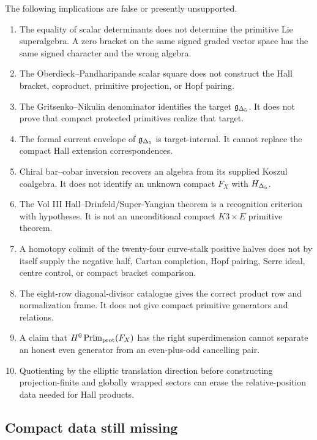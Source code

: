 The following implications are false or presently unsupported.
\begin{enumerate}
\item The equality of scalar determinants does not determine the primitive
Lie superalgebra.  A zero bracket on the same signed graded vector space has
the same signed character and the wrong algebra.
\item The Oberdieck--Pandharipande scalar square does not construct the Hall
bracket, coproduct, primitive projection, or Hopf pairing.
\item The Gritsenko--Nikulin denominator identifies the target
\(\mathfrak g_{\Delta_{5}}\).  It does not prove that compact protected primitives realize
that target.
\item The formal current envelope of \(\mathfrak g_{\Delta_{5}}\) is target-internal.  It
cannot replace the compact Hall extension correspondences.
\item Chiral bar--cobar inversion recovers an algebra from its supplied
Koszul coalgebra.  It does not identify an unknown compact \(F_X\) with
\(H_{\Delta_{5}}\).
\item The Vol III Hall--Drinfeld/Super-Yangian theorem is a recognition
criterion with hypotheses.  It is not an unconditional compact
\(K3\times E\) primitive theorem.
\item A homotopy colimit of the twenty-four curve-stalk positive halves does
not by itself supply the negative half, Cartan completion, Hopf pairing,
Serre ideal, centre control, or compact bracket comparison.
\item The eight-row diagonal-divisor catalogue gives the correct product row
and normalization frame.  It does not give compact primitive generators and
relations.
\item A claim that \(H^0\operatorname{Prim}_{\mathrm{prot}}(F_X)\) has the right superdimension cannot
separate an honest even generator from an even-plus-odd cancelling pair.
\item Quotienting by the elliptic translation direction before constructing
projection-finite and globally wrapped sectors can erase the relative-position
data needed for Hall products.
\end{enumerate}

\subsection{Compact data still missing}

